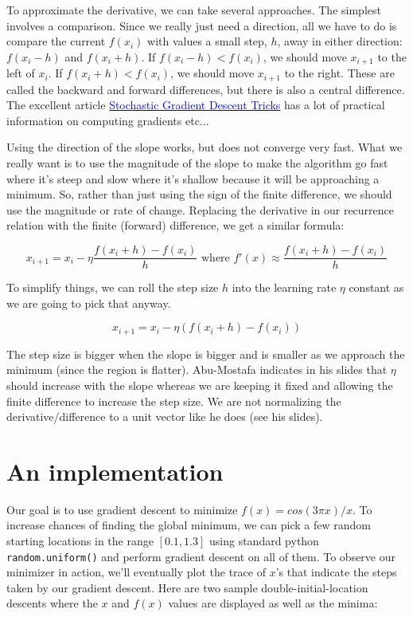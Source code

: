 \documentclass[titlepage]{tufte-book}
\begin{document}
\begin{fullwidth}
To approximate the derivative, we can take several approaches. The simplest involves a comparison. Since we really just need a direction, all we have to do is compare the current $f(x_i)$ with values a small step, $h$, away in either direction: $f(x_{i}-h)$ and $f(x_{i}+h)$.  If $f(x_{i}-h) < f(x_{i})$, we should move $x_{i+1}$ to the left of $x_{i}$. If $f(x_{i}+h) < f(x_{i})$, we should move $x_{i+1}$ to the right.  These are called the backward and forward differences, but there is also a central difference. The excellent article \href{http://research.microsoft.com/pubs/192769/tricks-2012.pdf}{\textcolor{blue}{Stochastic Gradient Descent Tricks}} has a lot of practical information on computing gradients etc...

Using the direction of the slope works, but does not converge very fast. What we really want is to use the magnitude of the slope to make the algorithm go fast where it's steep and slow where it's shallow because it will be approaching a minimum. So, rather than just using the sign of the finite difference, we should use the magnitude or rate of change. Replacing the derivative in our recurrence relation with the finite (forward) difference, we get a similar formula:

\[
x _{i+1} = x_i - \eta \frac{f(x_{i}+h) - f(x_{i})}{h} \text{ where } f'(x) \approx \frac{f(x_{i}+h) - f(x_{i})}{h}
\]

\noindent To simplify things, we can roll the step size $h$ into the learning rate $\eta$ constant as we are going to pick that anyway.

\[
x _{i+1} = x_i - \eta (f(x_{i}+h) - f(x_{i}))
\]

\noindent  The step size is bigger when the slope is bigger and is smaller as we approach the minimum (since the region is flatter). Abu-Mostafa indicates in his slides that $\eta$ should increase with the slope whereas we are keeping it fixed and allowing the finite difference to increase the step size. We are not normalizing the derivative/difference to a unit vector like he does (see his slides).

\section{An implementation}

Our goal is to use gradient descent to minimize $f(x) = cos(3\pi x) / x$. To increase chances of finding the global minimum, we can pick a few random starting locations in the range $[0.1,1.3]$ using standard python {\tt random.uniform()} and perform gradient descent on all of them. To  observe our minimizer in action, we'll eventually plot the trace of $x$'s that indicate the steps taken by our gradient descent. Here are two sample double-initial-location descents where the $x$ and $f(x)$ values are displayed as well as the minima:


\end{fullwidth}
\end{document}
